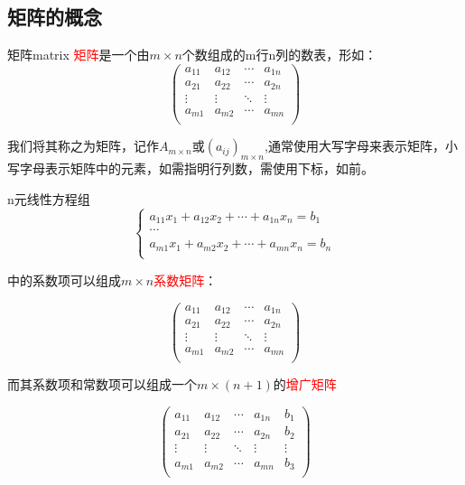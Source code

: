 \subsection{矩阵的概念}

\begin{definition}{矩阵}{matrix}
	\textcolor{red}{矩阵}是一个由$m\times n$个数组成的m行n列的数表，形如：
	$$
	\begin{pmatrix}
	a_{11} &a_{12}&\cdots&a_{1n}\\
	a_{21}&a_{22}&\cdots&a_{2n}\\
	\vdots&\vdots&\ddots&\vdots\\
	a_{m1}&a_{m2}&\cdots&a_{mn}\\
	\end{pmatrix}
	$$

	我们将其称之为矩阵，记作$A_{m\times n}$或$(a_{ij})_{m\times n}$,通常使用大写字母来表示矩阵，小写字母表示矩阵中的元素，如需指明行列数，需使用下标，如前。
\end{definition}

n元线性方程组
$$
\begin{cases}
	a_{11}x_1+a_{12}{x_2}+\cdots+a_{1n}x_n=b_1\\
	\cdots\\
	a_{m1}x_1+a_{m2}x_2+\cdots+a_{mn}x_n=b_n\\
\end{cases}
$$

中的系数项可以组成$m\times n$\textcolor{red}{系数矩阵}：

	$$
\begin{pmatrix}
	a_{11} &a_{12}&\cdots&a_{1n}\\
	a_{21}&a_{22}&\cdots&a_{2n}\\
	\vdots&\vdots&\ddots&\vdots\\
	a_{m1}&a_{m2}&\cdots&a_{mn}\\
\end{pmatrix}
$$

而其系数项和常数项可以组成一个$m\times (n+1)$的\textcolor{red}{增广矩阵}

	$$
\begin{pmatrix}
	a_{11} &a_{12}&\cdots&a_{1n}&b_1\\
	a_{21}&a_{22}&\cdots&a_{2n}&b_2\\
	\vdots&\vdots&\ddots&\vdots&\vdots\\
	a_{m1}&a_{m2}&\cdots&a_{mn}&b_3\\
\end{pmatrix}
$$

